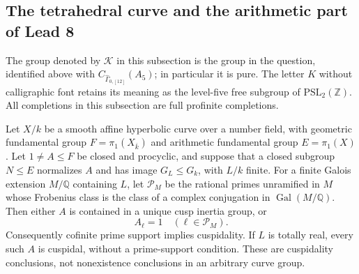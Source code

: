 \subsection{The tetrahedral curve and the arithmetic part of Lead 8}

The group denoted by $\mathcal K$ in this subsection is the group in
the question, identified above with
$C_{\widehat\Gamma_{0,[12]}}(A_5)$; in particular it is pure.
The letter $K$ without calligraphic font retains its meaning as the
level-five free subgroup of $\mathrm{PSL}_2(\mathbb Z)$.
All completions in this subsection are full profinite completions.

Let $X/k$ be a smooth affine hyperbolic curve over a number field, with
geometric fundamental group $F=\pi_1(X_{\overline k})$ and arithmetic
fundamental group $E=\pi_1(X)$.  Let $1\ne A\leq F$ be closed and
procyclic, and suppose that a closed subgroup $N\leq E$ normalizes $A$
and has image $G_L\leq G_k$, with $L/k$ finite.  For a finite Galois
extension $M/\mathbb Q$ containing $L$, let $\mathcal P_M$ be the
rational primes unramified in $M$ whose Frobenius class is the class
of a complex conjugation in $\operatorname{Gal}(M/\mathbb Q)$.
Then either $A$ is contained in a unique cusp inertia group, or
\[
                         A_\ell=1\quad(\ell\in\mathcal P_M).
                                                        \tag{B.29.1}
\]
Consequently cofinite prime support implies cuspidality.  If $L$ is
totally real, every such $A$ is cuspidal, without a prime-support
condition.  These are cuspidality conclusions, not nonexistence
conclusions in an arbitrary curve group.

